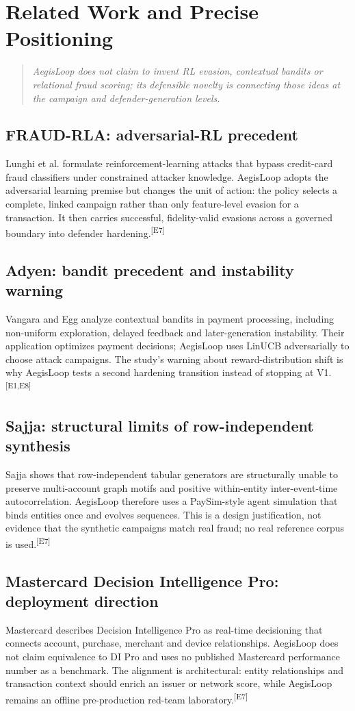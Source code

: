 \documentclass[11pt,a4paper,oneside]{article}
\newcommand{\evidence}[1]{\textsuperscript{\textcolor{EvidenceGray}{[#1]}}}
\newcommand{\sectionlead}[1]{\begin{quote}\itshape #1\end{quote}}
\begin{document}
\section{Related Work and Precise Positioning}
\sectionlead{AegisLoop does not claim to invent RL evasion, contextual bandits or relational fraud scoring; its defensible novelty is connecting those ideas at the campaign and defender-generation levels.}

\subsection{FRAUD-RLA: adversarial-RL precedent}
Lunghi et al. formulate reinforcement-learning attacks that bypass credit-card fraud classifiers under constrained attacker knowledge. AegisLoop adopts the adversarial learning premise but changes the unit of action: the policy selects a complete, linked campaign rather than only feature-level evasion for a transaction. It then carries successful, fidelity-valid evasions across a governed boundary into defender hardening.\evidence{E7}\cite{lunghi2025fraudrla}

\subsection{Adyen: bandit precedent and instability warning}
Vangara and Egg analyze contextual bandits in payment processing, including non-uniform exploration, delayed feedback and later-generation instability. Their application optimizes payment decisions; AegisLoop uses LinUCB adversarially to choose attack campaigns. The study's warning about reward-distribution shift is why AegisLoop tests a second hardening transition instead of stopping at V1.\evidence{E1,E8}\cite{vangara2024contextual}

\subsection{Sajja: structural limits of row-independent synthesis}
Sajja shows that row-independent tabular generators are structurally unable to preserve multi-account graph motifs and positive within-entity inter-event-time autocorrelation. AegisLoop therefore uses a PaySim-style agent simulation that binds entities once and evolves sequences. This is a design justification, not evidence that the synthetic campaigns match real fraud; no real reference corpus is used.\evidence{E7}\cite{sajja2026synthetic}

\subsection{Mastercard Decision Intelligence Pro: deployment direction}
Mastercard describes Decision Intelligence Pro as real-time decisioning that connects account, purchase, merchant and device relationships. AegisLoop does not claim equivalence to DI Pro and uses no published Mastercard performance number as a benchmark. The alignment is architectural: entity relationships and transaction context should enrich an issuer or network score, while AegisLoop remains an offline pre-production red-team laboratory.\evidence{E7}\cite{mastercard2024dipro}
\end{document}
